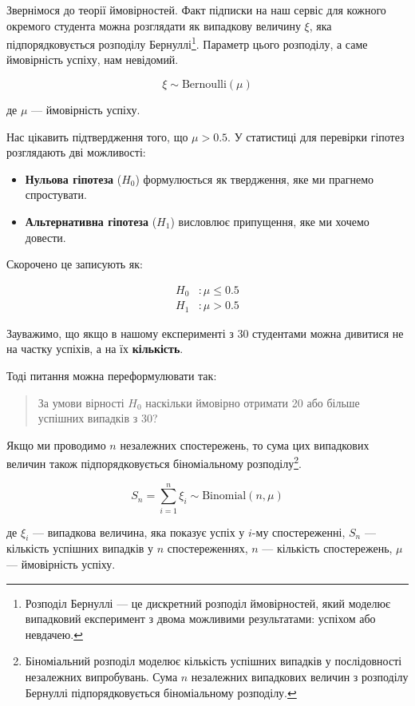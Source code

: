 \documentclass[
  letterpaper,
  10pt,
  openany]{report}
\providecommand{\tightlist}{%
  \setlength{\itemsep}{0pt}\setlength{\parskip}{0pt}}\usepackage{longtable,booktabs,array}
\theoremstyle{definition}
\theoremstyle{remark}
\begin{document}
Звернімося до теорії ймовірностей. Факт підписки на наш сервіс для
кожного окремого студента можна розглядати як випадкову величину
\(\xi\), яка підпорядковується розподілу Бернуллі\footnote{Розподіл
  Бернуллі --- це дискретний розподіл ймовірностей, який моделює
  випадковий експеримент з двома можливими результатами: успіхом або
  невдачею.}. Параметр цього розподілу, а саме ймовірність успіху, нам
невідомий.

\[
\xi \sim \text{Bernoulli}(\mu)
\]

де \(\mu\) --- ймовірність успіху.

Нас цікавить підтвердження того, що \(\mu > 0.5\). У статистиці для
перевірки гіпотез розглядають дві можливості:

\begin{itemize}
\tightlist
\item
  \textbf{Нульова гіпотеза} (\(H_0\)) формулюється як твердження, яке ми
  прагнемо спростувати.
\item
  \textbf{Альтернативна гіпотеза} (\(H_1\)) висловлює припущення, яке ми
  хочемо довести.
\end{itemize}

Скорочено це записують як:

\[
\begin{aligned}
H_0 &: \mu \leq 0.5 \\
H_1 &: \mu > 0.5
\end{aligned}
\]

Зауважимо, що якщо в нашому експерименті з 30 студентами можна дивитися
не на частку успіхів, а на їх \textbf{кількість}.

Тоді питання можна переформулювати так:

\begin{quote}
За умови вірності \(H_0\) наскільки ймовірно отримати 20 або більше
успішних випадків з 30?
\end{quote}

Якщо ми проводимо \(n\) незалежних спостережень, то сума цих випадкових
величин також підпорядковується біноміальному розподілу\footnote{Біноміальний
  розподіл моделює кількість успішних випадків у послідовності
  незалежних випробувань. Сума \(n\) незалежних випадкових величин з
  розподілу Бернуллі підпорядковується біноміальному розподілу.}.

\[
S_n = \sum_{i=1}^{n} \xi_i \sim \text{Binomial}(n, \mu)
\]

де \(\xi_i\) --- випадкова величина, яка показує успіх у \(i\)-му
спостереженні, \(S_n\) --- кількість успішних випадків у \(n\)
спостереженнях, \(n\) --- кількість спостережень, \(\mu\) ---
ймовірність успіху.
\end{document}
